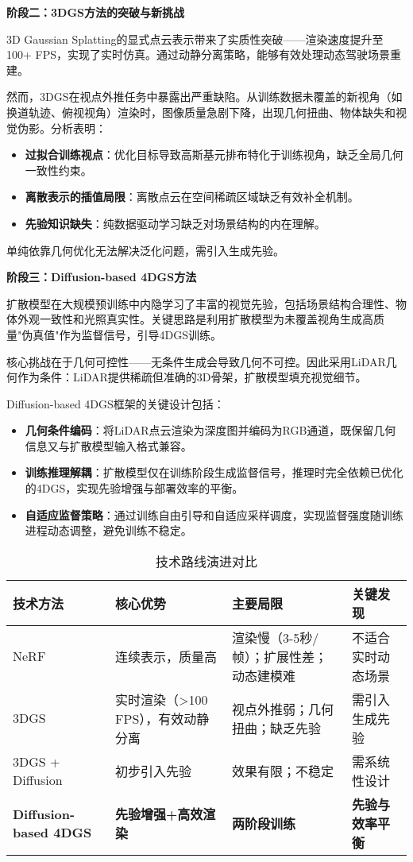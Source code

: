 \textbf{阶段二：3DGS方法的突破与新挑战}

3D Gaussian Splatting的显式点云表示带来了实质性突破——渲染速度提升至100+ FPS，实现了实时仿真。通过动静分离策略，能够有效处理动态驾驶场景重建。

然而，3DGS在视点外推任务中暴露出严重缺陷。从训练数据未覆盖的新视角（如换道轨迹、俯视视角）渲染时，图像质量急剧下降，出现几何扭曲、物体缺失和视觉伪影。分析表明：

\begin{itemize}
\item \textbf{过拟合训练视点}：优化目标导致高斯基元排布特化于训练视角，缺乏全局几何一致性约束。
\item \textbf{离散表示的插值局限}：离散点云在空间稀疏区域缺乏有效补全机制。
\item \textbf{先验知识缺失}：纯数据驱动学习缺乏对场景结构的内在理解。
\end{itemize}

单纯依靠几何优化无法解决泛化问题，需引入生成先验。

\textbf{阶段三：Diffusion-based 4DGS方法}

扩散模型在大规模预训练中内隐学习了丰富的视觉先验，包括场景结构合理性、物体外观一致性和光照真实性。关键思路是利用扩散模型为未覆盖视角生成高质量"伪真值"作为监督信号，引导4DGS训练。

核心挑战在于几何可控性——无条件生成会导致几何不可控。因此采用LiDAR几何作为条件：LiDAR提供稀疏但准确的3D骨架，扩散模型填充视觉细节。

Diffusion-based 4DGS框架的关键设计包括：

\begin{itemize}
\item \textbf{几何条件编码}：将LiDAR点云渲染为深度图并编码为RGB通道，既保留几何信息又与扩散模型输入格式兼容。
\item \textbf{训练推理解耦}：扩散模型仅在训练阶段生成监督信号，推理时完全依赖已优化的4DGS，实现先验增强与部署效率的平衡。
\item \textbf{自适应监督策略}：通过训练自由引导和自适应采样调度，实现监督强度随训练进程动态调整，避免训练不稳定。
\end{itemize}

\begin{table}[htbp]
\centering
\caption{技术路线演进对比}
\label{tab:technical-evolution}
\small
\begin{tabular}{p{2.2cm}p{3.2cm}p{4cm}p{2.8cm}}
\toprule
\textbf{技术方法} & \textbf{核心优势} & \textbf{主要局限} & \textbf{关键发现} \\
\midrule
NeRF & 连续表示，质量高 & 渲染慢（3-5秒/帧）；扩展性差；动态建模难 & 不适合实时动态场景 \\
\midrule
3DGS & 实时渲染（>100 FPS），有效动静分离 & 视点外推弱；几何扭曲；缺乏先验 & 需引入生成先验 \\
\midrule
3DGS + Diffusion & 初步引入先验 & 效果有限；不稳定 & 需系统性设计 \\
\midrule
\textbf{Diffusion-based 4DGS} & \textbf{先验增强+高效渲染} & \textbf{两阶段训练} & \textbf{先验与效率平衡} \\
\bottomrule
\end{tabular}
\end{table}

